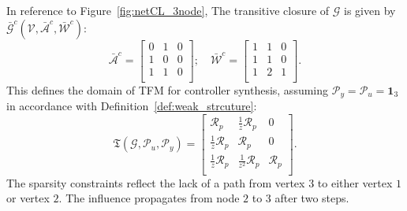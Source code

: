 In reference to Figure~\ref{fig:netCL_3node},
The transitive closure of \(\mathcal{G}\) is given by \(\bar{\mathcal G}^c(\mathcal{V}, \bar{\mathcal{A}}^c, \bar{\mathcal{W}}^c)\):
\[
\bar{\mathcal{A}}^c = \begin{bmatrix}
        0 & 1 & 0\\
        1 & 0 & 0\\
        1 & 1 & 0\\
\end{bmatrix};\quad 
\bar{\mathcal{W}}^c = \begin{bmatrix}
        1 & 1 & 0\\
        1 & 1 & 0\\
        1 & 2 & 1\\
\end{bmatrix}.
\]
This defines the domain of TFM for controller synthesis, assuming \(\mathcal{P}_y = \mathcal{P}_u = \mathbf{1}_3\) in accordance with Definition~\ref{def:weak_strcuture}:
\begin{equation}\label{eqn::TFMconstr1}
\mathfrak{T}(\mathcal{G},\mathcal{P}_u,\mathcal{P}_y) = 
\left[
\begin{array}{ccc}
\mathcal{R}_p & \frac{1}{z}\mathcal{R}_p & 0 \\
\frac{1}{z}\mathcal{R}_p & \mathcal{R}_p & 0 \\
\frac{1}{z}\mathcal{R}_p & \frac{1}{z^2}\mathcal{R}_p & \mathcal{R}_p \\
\end{array}
\right].
\end{equation}
The sparsity constraints reflect the lack of a path from vertex $3$ to either vertex $1$ or vertex $2$. The influence propagates from node $2$ to $3$ after two steps.








